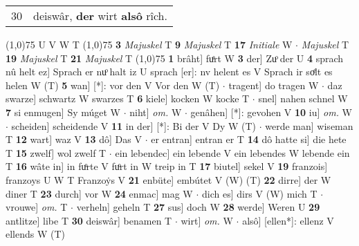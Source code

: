 \documentclass[8pt,a4paper,notitlepage]{article}
\begin{document}
\begin{table}[ht]
\begin{minipage}[t]{0.5\linewidth}
\begin{tabular}{rl}
30 & deiswâr, \textbf{der} wirt \textbf{alsô} rîch.\\ 
\end{tabular}
\scriptsize
\line(1,0){75} \newline
U V W T \newline
\line(1,0){75} \newline
\textbf{3} \textit{Majuskel} T  \textbf{9} \textit{Majuskel} T  \textbf{17} \textit{Initiale} W   $\cdot$ \textit{Majuskel} T  \textbf{19} \textit{Majuskel} T  \textbf{21} \textit{Majuskel} T  \newline
\line(1,0){75} \newline
\textbf{1} brâht] fuͤrt W \textbf{3} der] Zuͦ der U \textbf{4} sprach nû helt ez] Sprach er nuͦ halt iz U sprach [er]: nv helent es V Sprach ir soͤlt es helen W (T) \textbf{5} wan] [*]: vor den V Vor den W (T)  $\cdot$ tragent] do tragen W  $\cdot$ daz swarze] schwartz W swarzes T \textbf{6} kiele] kocken W kocke T  $\cdot$ snel] nahen schnel W \textbf{7} si enmugen] Sy múget W  $\cdot$ niht] \textit{om.} W  $\cdot$ genâhen] [*]: gevohen V \textbf{10} iu] \textit{om.} W  $\cdot$ scheiden] scheidende V \textbf{11} in der] [*]: Bi der V Dy W (T)  $\cdot$ werde man] wiseman T \textbf{12} wart] waz V \textbf{13} dô] Das V  $\cdot$ er entran] entran er T \textbf{14} dô hatte si] die hete T \textbf{15} zwelf] wol zwelf T  $\cdot$ ein lebendec] ein lebende V ein lebendes W lebende ein T \textbf{16} wâte in] in fuͦrte V fuͦrt in W treip in T \textbf{17} biutel] sekel V \textbf{19} franzois] franzoys U W T Franzoẏs V \textbf{21} enbüte] embútet V (W) (T) \textbf{22} dirre] der W diner T \textbf{23} durch] vor W \textbf{24} enmac] mag W  $\cdot$ dich es] dirs V (W) mich T  $\cdot$ vrouwe] \textit{om.} T  $\cdot$ verheln] geheln T \textbf{27} sus] doch W \textbf{28} werde] Weren U \textbf{29} antlitze] libe T \textbf{30} deiswâr] benamen T  $\cdot$ wirt] \textit{om.} W  $\cdot$ alsô] [ellen*]: ellenz V ellends W (T) \newline
\end{minipage}
\end{table}
\end{document}
